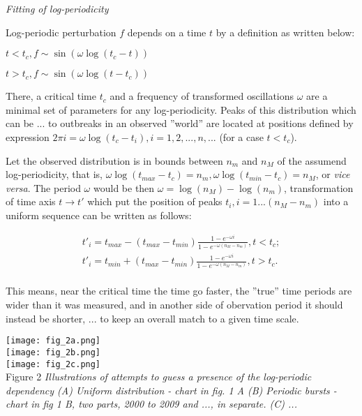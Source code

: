 \documentclass[a4paper]{article}
\begin{document}
\textit{Fitting of log-periodicity}

Log-periodic perturbation $f$ depends on a time $t$ by a definition as written below: 

$t < t_c, f \sim \sin( \omega \log( t_c - t ) )$

$t > t_c, f \sim \sin( \omega \log( t - t_c ) )$

There, a critical time $t_c$ and a frequency of transformed oscillations $\omega$ are a minimal set of parameters for any log-periodicity. Peaks of this distribution which can be ... to outbreaks in an observed ''world'' are located at positions defined by expression $ 2 \pi i =  \omega \log( t_c - t_i ), i = 1, 2,  ..., n, ... $ (for a case $t < t_c$).

Let the observed distribution is in bounds between $n_m$ and $n_M$ of the assumend log-periodicity, that is, $\omega \log( t_{max} - t_c )  = n_m, \omega \log( t_{min} - t_c ) = n_M$, or \textit{vice versa}. The period $\omega$ would be then $\omega = \log( n_M ) - \log( n_m ) $, transformation of time axis $t \to t'$ which put the position of peaks $t_i, i = 1 ... (n_M - n_m)$ into a uniform sequence can be written as follows:

\begin{eqnarray}
t'_i = t_{max} - ( t_{max} - t_{min} )\frac{ 1 - e^{ - \omega i } }{ 1 - e^{ - \omega (n_M - n_m) } }, t < t_c; \nonumber\\
t'_i = t_{min} + ( t_{max} - t_{min} )\frac{ 1 - e^{ - \omega i } }{ 1 - e^{ - \omega (n_M - n_m) } }, t > t_c. \\
\end{eqnarray}

This means, near the critical time the time go faster, the ''true'' time periods are wider than it was measured, and in another side of obervation period it should instead be shorter, ... to keep an overall match to a given time scale. 

\newpage

\noindent
\texttt{[image: fig\_2a.png]}\\
\texttt{[image: fig\_2b.png]}\\
\texttt{[image: fig\_2c.png]}\\
\vskip 12pt
Figure 2 \textit{Illustrations of attempts to guess a presence of the log-periodic dependency (A) Uniform distribution - chart in fig. 1 A (B) Periodic bursts - chart in fig 1 B, two parts, 2000 to 2009 and ..., in separate. (C) ...}
\vskip 12pt
\end{document}
